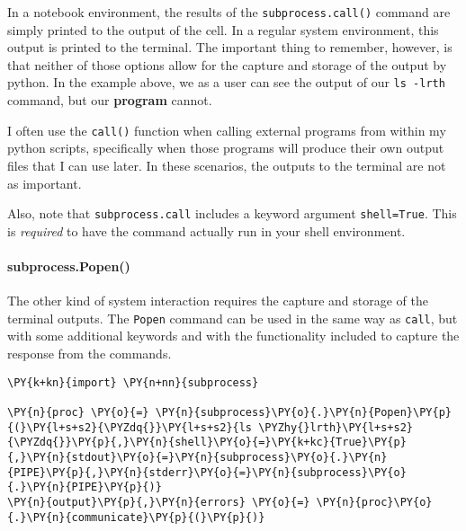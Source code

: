     In a notebook environment, the results of the \texttt{subprocess.call()}
command are simply printed to the output of the cell. In a regular
system environment, this output is printed to the terminal. The
important thing to remember, however, is that neither of those options
allow for the capture and storage of the output by python. In the
example above, we as a user can see the output of our \texttt{ls\ -lrth}
command, but our \textbf{program} cannot.

I often use the \texttt{call()} function when calling external programs
from within my python scripts, specifically when those programs will
produce their own output files that I can use later. In these scenarios,
the outputs to the terminal are not as important.

Also, note that \texttt{subprocess.call} includes a keyword argument
\texttt{shell=True}. This is \emph{required} to have the command
actually run in your shell environment.

\hypertarget{subprocess.popen}{%
\paragraph{subprocess.Popen()}\label{subprocess.popen}}

The other kind of system interaction requires the capture and storage of
the terminal outputs. The \texttt{Popen} command can be used in the same
way as \texttt{call}, but with some additional keywords and with the
functionality included to capture the response from the commands.

    \begin{tcolorbox}[breakable, size=fbox, boxrule=1pt, pad at break*=1mm,colback=cellbackground, colframe=cellborder]
\begin{Verbatim}[commandchars=\\\{\}]
\PY{k+kn}{import} \PY{n+nn}{subprocess}

\PY{n}{proc} \PY{o}{=} \PY{n}{subprocess}\PY{o}{.}\PY{n}{Popen}\PY{p}{(}\PY{l+s+s2}{\PYZdq{}}\PY{l+s+s2}{ls \PYZhy{}lrth}\PY{l+s+s2}{\PYZdq{}}\PY{p}{,}\PY{n}{shell}\PY{o}{=}\PY{k+kc}{True}\PY{p}{,}\PY{n}{stdout}\PY{o}{=}\PY{n}{subprocess}\PY{o}{.}\PY{n}{PIPE}\PY{p}{,}\PY{n}{stderr}\PY{o}{=}\PY{n}{subprocess}\PY{o}{.}\PY{n}{PIPE}\PY{p}{)}
\PY{n}{output}\PY{p}{,}\PY{n}{errors} \PY{o}{=} \PY{n}{proc}\PY{o}{.}\PY{n}{communicate}\PY{p}{(}\PY{p}{)}
\end{Verbatim}
\end{tcolorbox}

